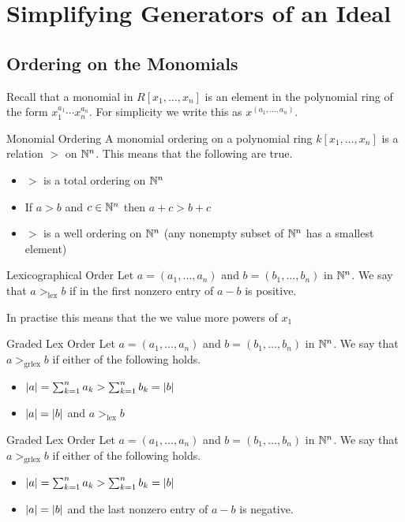 \documentclass[a4paper]{article}
\begin{document}
\pagebreak
\section{Simplifying Generators of an Ideal}
\subsection{Ordering on the Monomials}
Recall that a monomial in $R[x_1,\dots,x_n]$ is an element in the polynomial ring of the form $x_1^{a_1}\cdots x_n^{a_n}$. For simplicity we write this as $x^{(a_1,\dots,a_n)}$. 

\begin{defn}{Monomial Ordering}{} A monomial ordering on a polynomial ring $k[x_1,\dots,x_n]$ is a relation $>$ on $\mathbb{N}^n$. This means that the following are true. 
\begin{itemize}
\item $>$ is a total ordering on $\mathbb{N}^n$
\item If $a>b$ and $c\in\mathbb{N}^n$ then $a+c>b+c$
\item $>$ is a well ordering on $\mathbb{N}^n$ (any nonempty subset of $\mathbb{N}^n$ has a smallest element)
\end{itemize}
\end{defn}

\begin{defn}{Lexicographical Order}{} Let $a=(a_1,\dots,a_n)$ and $b=(b_1,\dots,b_n)$ in $\mathbb{N}^n$. We say that $a>_{\text{lex}}b$ if in the first nonzero entry of $a-b$ is positive. 
\end{defn}

In practise this means that the we value more powers of $x_1$

\begin{defn}{Graded Lex Order}{} Let $a=(a_1,\dots,a_n)$ and $b=(b_1,\dots,b_n)$ in $\mathbb{N}^n$. We say that $a>_{\text{grlex}}b$ if either of the following holds. 
\begin{itemize}
\item $\abs{a}=\sum_{k=1}^na_k>\sum_{k=1}^nb_k=\abs{b}$
\item $\abs{a}=\abs{b}$ and $a>_{\text{lex}}b$
\end{itemize}
\end{defn}

\begin{defn}{Graded Lex Order}{} Let $a=(a_1,\dots,a_n)$ and $b=(b_1,\dots,b_n)$ in $\mathbb{N}^n$. We say that $a>_{\text{grlex}}b$ if either of the following holds. 
\begin{itemize}
\item $\abs{a}=\sum_{k=1}^na_k>\sum_{k=1}^nb_k=\abs{b}$
\item $\abs{a}=\abs{b}$ and the last nonzero entry of $a-b$ is negative. 
\end{itemize}
\end{defn}
\end{document}
